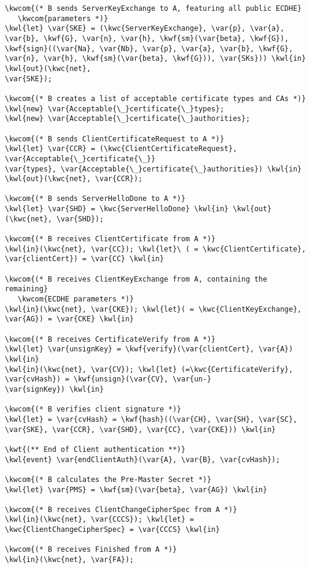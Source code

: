 \begin{Verbatim}[commandchars=\\\{\},codes={\catcode`$=3}]
\kwcom{(* B sends ServerKeyExchange to A, featuring all public ECDHE}
   \kwcom{parameters *)}
\kwl{let} \var{SKE} = (\kwc{ServerKeyExchange}, \var{p}, \var{a}, \var{b}, \kwf{G}, \var{n}, \var{h}, \kwf{sm}(\var{beta}, \kwf{G}),
\kwf{sign}((\var{Na}, \var{Nb}, \var{p}, \var{a}, \var{b}, \kwf{G}, \var{n}, \var{h}, \kwf{sm}(\var{beta}, \kwf{G})), \var{SKs})) \kwl{in} \kwl{out}(\kwc{net},
\var{SKE});

\kwcom{(* B creates a list of acceptable certificate types and CAs *)}
\kwl{new} \var{Acceptable{\_}certificate{\_}types};
\kwl{new} \var{Acceptable{\_}certificate{\_}authorities};

\kwcom{(* B sends ClientCertificateRequest to A *)}
\kwl{let} \var{CCR} = (\kwc{ClientCertificateRequest}, \var{Acceptable{\_}certificate{\_}}
\var{types}, \var{Acceptable{\_}certificate{\_}authorities}) \kwl{in} \kwl{out}(\kwc{net}, \var{CCR});

\kwcom{(* B sends ServerHelloDone to A *)}
\kwl{let} \var{SHD} = \kwc{ServerHelloDone} \kwl{in} \kwl{out}(\kwc{net}, \var{SHD});

\kwcom{(* B receives ClientCertificate from A *)}
\kwl{in}(\kwc{net}, \var{CC}); \kwl{let}\ ( = \kwc{ClientCertificate}, \var{clientCert}) = \var{CC} \kwl{in}

\kwcom{(* B receives ClientKeyExchange from A, containing the remaining}
   \kwcom{ECDHE parameters *)}
\kwl{in}(\kwc{net}, \var{CKE}); \kwl{let}( = \kwc{ClientKeyExchange}, \var{AG}) = \var{CKE} \kwl{in}

\kwcom{(* B receives CertificateVerify from A *)}
\kwl{let} \var{unsignKey} = \kwf{verify}(\var{clientCert}, \var{A}) \kwl{in}
\kwl{in}(\kwc{net}, \var{CV}); \kwl{let} (=\kwc{CertificateVerify}, \var{cvHash}) = \kwf{unsign}(\var{CV}, \var{un-}
\var{signKey}) \kwl{in}

\kwcom{(* B verifies client signature *)} 
\kwl{let} = \var{cvHash} = \kwf{hash}((\var{CH}, \var{SH}, \var{SC}, \var{SKE}, \var{CCR}, \var{SHD}, \var{CC}, \var{CKE})) \kwl{in}

\kwt{(** End of Client authentication **)}
\kwl{event} \var{endClientAuth}(\var{A}, \var{B}, \var{cvHash});

\kwcom{(* B calculates the Pre-Master Secret *)}
\kwl{let} \var{PMS} = \kwf{sm}(\var{beta}, \var{AG}) \kwl{in}

\kwcom{(* B receives ClientChangeCipherSpec from A *)}
\kwl{in}(\kwc{net}, \var{CCCS}); \kwl{let} = \kwc{ClientChangeCipherSpec} = \var{CCCS} \kwl{in}

\kwcom{(* B receives Finished from A *)}
\kwl{in}(\kwc{net}, \var{FA});


\end{Verbatim}
